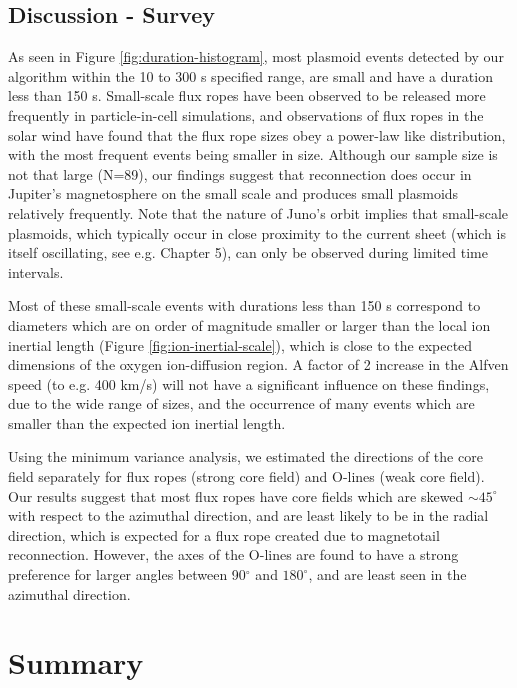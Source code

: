 \subsection{Discussion - Survey}

As seen in Figure \ref{fig:duration-histogram}, most plasmoid events detected by our algorithm within the 10 to 300 s specified range, are small and have a duration less than 150 s. Small-scale flux ropes have been observed to be released more frequently in particle-in-cell simulations, and observations of flux ropes in the solar wind have found that the flux rope sizes obey a power-law like distribution, with the most frequent events being smaller in size. Although our sample size is not that large (N=89), our findings suggest that reconnection does occur in Jupiter's magnetosphere on the small scale and produces small plasmoids relatively frequently. Note that the nature of Juno's orbit implies that small-scale plasmoids, which typically occur in close proximity to the current sheet (which is itself oscillating, see e.g. Chapter 5), can only be observed during limited time intervals.

Most of these small-scale events with durations less than 150 s correspond to diameters which are on order of magnitude smaller or larger than the local ion inertial length (Figure \ref{fig:ion-inertial-scale}), which is close to the expected dimensions of the oxygen ion-diffusion region. A factor of 2 increase in the Alfven speed (to e.g. 400 km/s) will not have a significant influence on these findings, due to the wide range of sizes, and the occurrence of many events which are smaller than the expected ion inertial length. 

Using the minimum variance analysis, we estimated the directions of the core field separately for flux ropes (strong core field) and O-lines (weak core field). Our results suggest that most flux ropes have core fields which are skewed $\sim45^\circ$ with respect to the azimuthal direction, and are least likely to be in the radial direction, which is expected for a flux rope created due to magnetotail reconnection. However, the axes of the O-lines are found to have a strong preference for larger angles between 90$^\circ$ and $180^\circ$, and are least seen in the azimuthal direction. 

\section{Summary}

